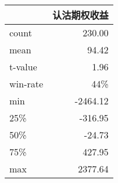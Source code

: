 \begin{tabular}{lr}
\toprule
{} &   认沽期权收益 \\
\midrule
count &   230.00 \\
mean  &    94.42 \\
t-value   &   1.96 \\
win-rate & 44\%   \\
min   & -2464.12 \\
25\%   &  -316.95 \\
50\%   &   -24.73 \\
75\%   &   427.95 \\
max   &  2377.64 \\
\bottomrule
\end{tabular}
